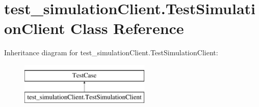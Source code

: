 \hypertarget{classtest__simulation_client_1_1_test_simulation_client}{}\section{test\+\_\+simulation\+Client.\+Test\+Simulation\+Client Class Reference}
\label{classtest__simulation_client_1_1_test_simulation_client}
Inheritance diagram for test\+\_\+simulation\+Client.\+Test\+Simulation\+Client\+:\begin{figure}[H]
\begin{center}
\leavevmode
\includegraphics[height=2.000000cm]{classtest__simulation_client_1_1_test_simulation_client}
\end{center}
\end{figure}
